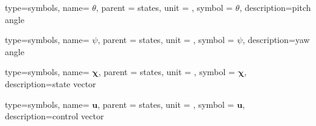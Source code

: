 {type=symbols,
	name= \ensuremath{\theta},
	parent = {states},
	unit = \unexpanded{\si{\radian}},
	symbol = \ensuremath{\theta},
	description={pitch angle}
}

{type=symbols,
	name= \ensuremath{\psi},
	parent = {states},
	unit = \unexpanded{\si{\radian}},
	symbol = \ensuremath{\psi},
	description={yaw angle}
}

{type=symbols,
	name= \ensuremath{\boldsymbol{\chi}},
	parent = {states},
	unit = \unexpanded{},
	symbol = \ensuremath{\boldsymbol{\chi}},
	description={state vector}
}

{type=symbols,
	name= \ensuremath{\boldsymbol{u}},
	parent = {states},
	unit = \unexpanded{},
	symbol = \ensuremath{\boldsymbol{u}},
	description={control vector}
}


